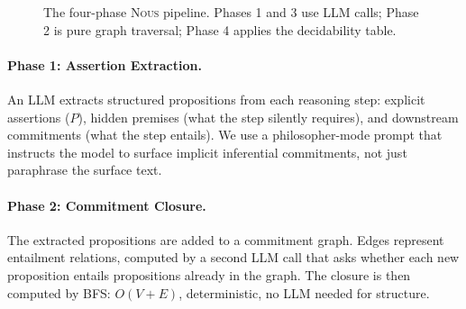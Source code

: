 \documentclass[11pt]{article}
\newcommand{\C}{\mathcal{C}}      %
\newcommand{\nous}{\textsc{Nous}} %
\begin{document}
\begin{figure}[h]
\centering
{}
\caption{The four-phase \nous{} pipeline. Phases 1 and 3 use LLM calls;
  Phase 2 is pure graph traversal; Phase 4 applies the decidability table.}
\label{fig:pipeline}
\end{figure}

\paragraph{Phase 1: Assertion Extraction.}
An LLM extracts structured propositions from each reasoning step: explicit
assertions ($P$), hidden premises (what the step silently requires), and
downstream commitments (what the step entails). We use a philosopher-mode
prompt that instructs the model to surface implicit inferential commitments,
not just paraphrase the surface text.

\paragraph{Phase 2: Commitment Closure.}
The extracted propositions are added to a commitment graph. Edges represent
entailment relations, computed by a second LLM call that asks whether each
new proposition entails propositions already in the graph. The closure is
then computed by BFS: $O(V + E)$, deterministic, no LLM needed for structure.
\end{document}
